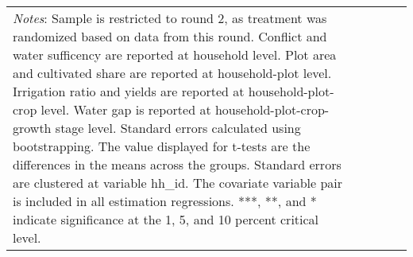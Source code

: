 \documentclass{article}
\begin{document}
\begin{table}[!htbp]
\begin{adjustbox}{max width=\textwidth}
\begin{tabular}{@{\extracolsep{5pt}}lcccc}
{\textit{Notes}: Sample is restricted to round 2, as treatment was randomized based on data from this round. Conflict and water sufficency are reported at household level. Plot area and cultivated share are reported at household-plot level. Irrigation ratio and yields are reported at household-plot-crop level. Water gap is reported at household-plot-crop-growth stage level. Standard errors calculated using bootstrapping. The value displayed for t-tests are the differences in the means across the groups. Standard errors are clustered at variable hh\_id. The covariate variable pair is included in all estimation regressions. ***, **, and * indicate significance at the 1, 5, and 10 percent critical level. }
\end{tabular}
\end{adjustbox}
\end{table}
\end{document}
